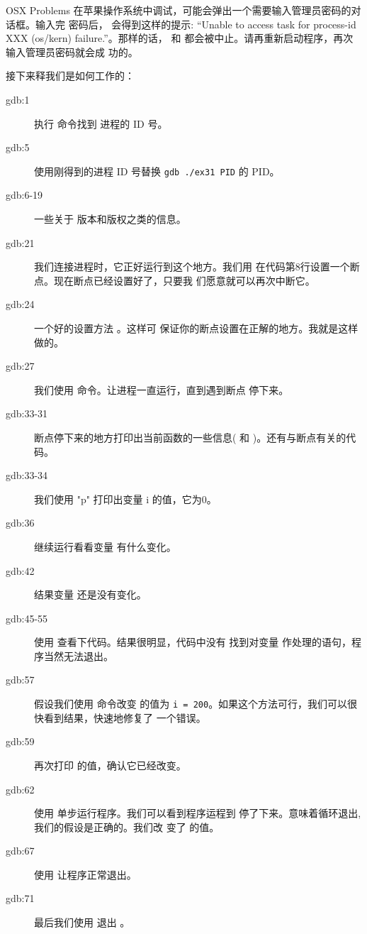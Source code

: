\begin{enumerate}
\begin{aside}{OSX Problems}
在苹果操作系统中调试，可能会弹出一个需要输入管理员密码的对话框。输入完
密码后，  会得到这样的提示: “Unable to access task for
process-id XXX (os/kern) failure.”。那样的话， 和
 都会被中止。请再重新启动程序，再次输入管理员密码就会成
功的。
\end{aside}

接下来释我们是如何工作的：

\begin{description}
\item[gdb:1] 执行  命令找到  进程的 ID 号。
\item[gdb:5] 使用刚得到的进程 ID 号替换 \verb|gdb ./ex31 PID| 的 PID。
\item[gdb:6-19] 一些关于  版本和版权之类的信息。
\item[gdb:21] 我们连接进程时，它正好运行到这个地方。我们用
   在代码第8行设置一个断点。现在断点已经设置好了，只要我
  们愿意就可以再次中断它。
\item[gdb:24] 一个好的设置方法 。这样可
  保证你的断点设置在正解的地方。我就是这样做的。
\item[gdb:27] 我们使用  命令。让进程一直运行，直到遇到断点
  停下来。
\item[gdb:33-31] 断点停下来的地方打印出当前函数的一些信息(
  和 )。还有与断点有关的代码。
\item[gdb:33-34] 我们使用  "p" 打印出变量 i 的值，它为0。
\item[gdb:36] 继续运行看看变量  有什么变化。
\item[gdb:42] 结果变量  还是没有变化。
\item[gdb:45-55] 使用  查看下代码。结果很明显，代码中没有
  找到对变量  作处理的语句，程序当然无法退出。
\item[gdb:57] 假设我们使用  命令改变  的值为
  \verb|i = 200|。如果这个方法可行，我们可以很快看到结果，快速地修复了
  一个错误。
\item[gdb:59] 再次打印  的值，确认它已经改变。
\item[gdb:62] 使用  单步运行程序。我们可以看到程序运程到
   停了下来。意味着循环退出,我们的假设是正确的。我们改
  变了  的值。
\item[gdb:67] 使用 让程序正常退出。
\item[gdb:71] 最后我们使用  退出 。
\end{description}



\end{enumerate}
